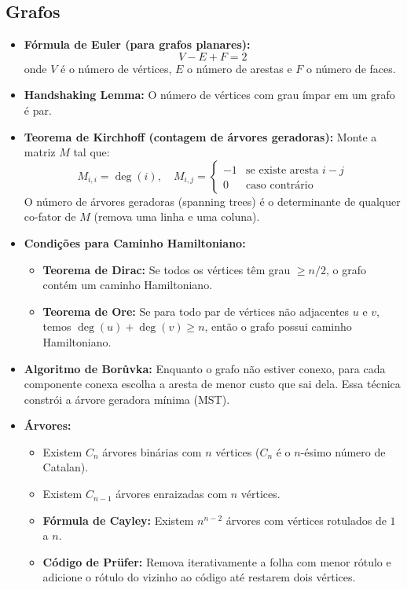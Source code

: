 \subsection{Grafos}

\begin{small}
\begin{itemize}
    \item \textbf{Fórmula de Euler (para grafos planares):}
    \[
    V - E + F = 2
    \]
    onde $V$ é o número de vértices, $E$ o número de arestas e $F$ o número de faces.

    \item \textbf{Handshaking Lemma:} O número de vértices com grau ímpar em um grafo é par.

    \item \textbf{Teorema de Kirchhoff (contagem de árvores geradoras):} 
    Monte a matriz $M$ tal que:
    \[
    M_{i,i} = \deg(i), \quad M_{i,j} = 
    \begin{cases}
    -1 & \text{se existe aresta } i-j \\
    0  & \text{caso contrário}
    \end{cases}
    \]
    O número de árvores geradoras (spanning trees) é o determinante de qualquer co-fator de $M$ (remova uma linha e uma coluna).

    \item \textbf{Condições para Caminho Hamiltoniano:}
    \begin{itemize}
        \item \textbf{Teorema de Dirac:} Se todos os vértices têm grau $\geq n/2$, o grafo contém um caminho Hamiltoniano.
        \item \textbf{Teorema de Ore:} Se para todo par de vértices não adjacentes $u$ e $v$, temos $\deg(u) + \deg(v) \geq n$, então o grafo possui caminho Hamiltoniano.
    \end{itemize}

    \item \textbf{Algoritmo de Borůvka:} Enquanto o grafo não estiver conexo, para cada componente conexa escolha a aresta de menor custo que sai dela. Essa técnica constrói a árvore geradora mínima (MST).

    \item \textbf{Árvores:}
    \begin{itemize}
        \item Existem $C_n$ árvores binárias com $n$ vértices ($C_n$ é o $n$-ésimo número de Catalan).
        \item Existem $C_{n-1}$ árvores enraizadas com $n$ vértices.
        \item \textbf{Fórmula de Cayley:} Existem $n^{n-2}$ árvores com vértices rotulados de $1$ a $n$.
        \item \textbf{Código de Prüfer:} Remova iterativamente a folha com menor rótulo e adicione o rótulo do vizinho ao código até restarem dois vértices.
    \end{itemize}


\end{itemize}
\end{small}

